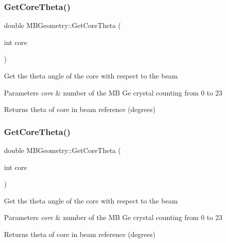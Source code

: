 \subsubsection{\texorpdfstring{Get\+Core\+Theta()}{GetCoreTheta()}\hspace{0.1cm}{\footnotesize\ttfamily [1/2]}}
{\footnotesize\ttfamily double M\+B\+Geometry\+::\+Get\+Core\+Theta (\begin{DoxyParamCaption}\item[{int}]{core }\end{DoxyParamCaption})}

Get the theta angle of the core with respect to the beam 
\begin{DoxyParams}{Parameters}
{\em core} & number of the MB Ge crystal counting from 0 to 23 \\
\hline
\end{DoxyParams}
\begin{DoxyReturn}{Returns}
theta of core in beam reference (degrees) 
\end{DoxyReturn}
\mbox{\label{class_m_b_geometry_a42aa536f15017724812712b0f8a77c12}} 
\subsubsection{\texorpdfstring{Get\+Core\+Theta()}{GetCoreTheta()}\hspace{0.1cm}{\footnotesize\ttfamily [2/2]}}
{\footnotesize\ttfamily double M\+B\+Geometry\+::\+Get\+Core\+Theta (\begin{DoxyParamCaption}\item[{int}]{core }\end{DoxyParamCaption})}

Get the theta angle of the core with respect to the beam 
\begin{DoxyParams}{Parameters}
{\em core} & number of the MB Ge crystal counting from 0 to 23 \\
\hline
\end{DoxyParams}
\begin{DoxyReturn}{Returns}
theta of core in beam reference (degrees) 
\end{DoxyReturn}
\mbox{\label{class_m_b_geometry_a575ddd6022d2d686a83ebce3195b6c50}} 
